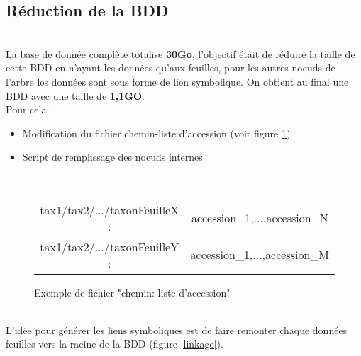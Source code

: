 \subsection{R\'eduction de la BDD}
~\\

La base de donnée complète totalise \textbf{30Go}, l'objectif était de réduire la taille de cette BDD en n'ayant les données qu'aux feuilles, pour les autres noeuds de l'arbre les données sont sous forme de lien symbolique. On obtient au final une BDD avec une taille de \textbf{1,1GO}.
~\\

Pour cela:
\\
\begin{itemize}
 \item Modification du fichier chemin-liste d’accession (voir figure \ref{resultatS})
  \item Script de remplissage des noeuds internes
\end{itemize}
~\\

\begin{figure}[H]
\begin{center}
\begin{tabular}{*{2}{c}}
  tax1/tax2/.../taxonFeuilleX : & accession\_1,...,accession\_N  \\
  tax1/tax2/.../taxonFeuilleY : & accession\_1,...,accession\_M  \\
\end{tabular}
\caption{\label{resultatS} Exemple de fichier "chemin: liste d'accession"}
\end{center}
\end{figure}
~\\

L'idée pour générer les liens symboliques est de faire remonter chaque données feuilles vers la racine de la BDD (figure \ref{linkage}).

\lstset{
	language=C,
	morecomment=[l][keywordstyle]{@\#},
	keywordstyle=\bfseries\ttfamily\color[rgb]{0,0,1},
	identifierstyle=\ttfamily,
	commentstyle=\color[rgb]{0.133,0.545,0.133},
	stringstyle=\ttfamily\color[rgb]{0.627,0.126,0.941},
	showstringspaces=false,
	basicstyle=\small,
	numberstyle=\footnotesize,
	numbers=left,
	stepnumber=1,
	numbersep=8pt,
	tabsize=2,
	breaklines=true,
	prebreak = \raisebox{0ex}[0ex][0ex]{\ensuremath{\hookleftarrow}},
	breakatwhitespace=false,
	aboveskip={1.5\baselineskip},
  columns=fixed,
  upquote=true,
  extendedchars=true,
  frame=single,
}


